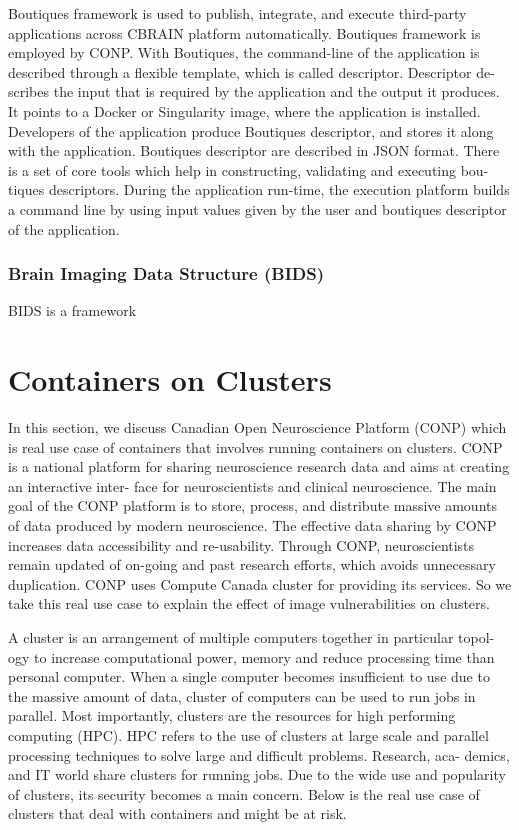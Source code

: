 \documentclass[a4paper,num-refs]{oup-contemporary}
\begin{document}
Boutiques framework is used to publish, integrate, and execute third-party
applications across CBRAIN platform automatically. Boutiques framework is
employed by CONP. With Boutiques, the command-line of the application is
described through a flexible template, which is called descriptor. Descriptor de-
scribes the input that is required by the application and the output it produces.
It points to a Docker or Singularity image, where the application is installed.
Developers of the application produce Boutiques descriptor, and stores it along
with the application. Boutiques descriptor are described in JSON format. There
is a set of core tools which help in constructing, validating and executing bou-
tiques descriptors. During the application run-time, the execution platform
builds a command line by using input values given by the user and boutiques
descriptor of the application.

\subsubsection{Brain Imaging Data Structure (BIDS)}

 BIDS is a framework


\section{Containers on Clusters}

In this section, we discuss Canadian Open Neuroscience Platform (CONP) which is 
real use case of containers that involves running containers on clusters. 
CONP is a national platform
for sharing neuroscience research data and aims at creating an interactive inter-
face for neuroscientists and clinical neuroscience. The main goal of the CONP
platform is to store, process, and distribute massive amounts of data produced
by modern neuroscience. The effective data sharing by CONP increases data
accessibility and re-usability. Through CONP, neuroscientists remain updated
of on-going and past research efforts, which avoids unnecessary duplication.
CONP uses Compute Canada cluster for providing its services. So we take
this real use case to explain the effect of image vulnerabilities on clusters.


A cluster is an arrangement of multiple computers together in particular topol-
ogy to increase computational power, memory and reduce processing time than
personal computer. When a single computer becomes insufficient to use due
to the massive amount of data, cluster of computers can be used to run jobs
in parallel. Most importantly, clusters are the resources for high performing
computing (HPC). HPC refers to the use of clusters at large scale and parallel
processing techniques to solve large and difficult problems. Research, aca-
demics, and IT world share clusters for running jobs. Due to the wide use and
popularity of clusters, its security becomes a main concern. Below is the real
use case of clusters that deal with containers and might be at risk.



\end{document}
